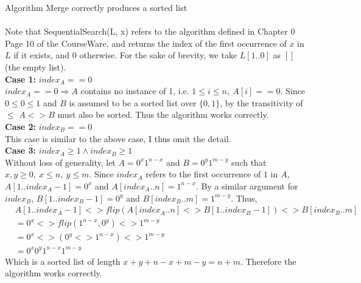 \documentclass[12pt]{article}
\newenvironment{lemma}[2][Lemma]{\begin{trivlist}
\item[\hskip \labelsep {\bfseries #1}\hskip \labelsep {\bfseries #2.}]}{\end{trivlist}}
\newenvironment{question}[2][Question]{\begin{trivlist}
\item[\hskip \labelsep {\bfseries #1}\hskip \labelsep {\bfseries #2.}]}{\end{trivlist}}
\begin{document}
\begin{question}{1 (a)}
  \begin{lemma}{1.1} Algorithm Merge correctly produces a sorted list
    \leavevmode \\ \\
    Note that SequentialSearch(L, x) refers to the algorithm defined in Chapter 0
    Page 10 of the CourseWare, and returns the index of the first occurrence
    of $x$ in $L$ if it exists, and $0$ otherwise. For the sake of brevity,
    we take $L[1..0]$ as $[]$ (the empty list). \\

    \textbf{Case 1:} $index_{A} == 0$\\
    $index_{A} == 0 \Rightarrow A$ contains no instance of 1, i.e.
    $ 1 \leq i \leq n,\ A[i] == 0$.  Since $0 \leq 0 \leq 1$ and $B$ is assumed
    to be a sorted list over $\{0, 1\}$, by the transitivity of $\leq$ $A <> B$
    must also be sorted. Thus the algorithm works correctly.\\

    \textbf{Case 2:} $index_{B} == 0$\\
    This case is similar to the above case, I thus omit the detail. \\

    \textbf{Case 3:} $index_{A} \geq 1 \land index_{B} \geq 1$\\
    Without loss of generality, let $A = 0^{x}1^{n-x}$ and
    $B = 0^{y}1^{m-y}$ such that $x, y \geq 0,\ x \leq n,\ y \leq m$.
    Since $index_{A}$ refers to the first occurrence of $1$ in $A$,
    $A[1..index_{A} - 1] = 0^{x}$ and $A[index_{A}..n] = 1^{n-x}$.  By a similar
    argument for $index_{B}$, $B[1..index_{B} - 1] = 0^{y}$ and $B[index_{B}..m] = 1^{m-y}$.
    Thus,
    \begin{align*}
      & A[1..index_{A} - 1] <> flip(A[index_{A}..n] <> B[1..index_{B} - 1]) <> B[index_{B}..m] &\\
      & = 0^{x} <> flip(1^{n-x}, 0^{y}) <> 1^{m-y} & \\
      & = 0^{x} <> (0^{y} <> 1^{n-x}) <> 1^{m-y} & \\
      & = 0^{x}0^{y}1^{n-x}1^{m-y} &
    \end{align*}
    Which is a sorted list of length $x + y + n - x + m - y = n + m$.
    Therefore the algorithm works correctly.
  \end{lemma}


\end{question}
\end{document}
